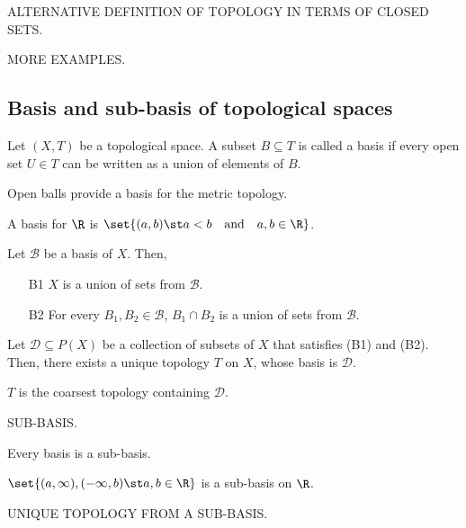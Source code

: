 ALTERNATIVE DEFINITION OF TOPOLOGY IN TERMS OF CLOSED SETS.

MORE EXAMPLES.

\subsection{Basis and sub-basis of topological spaces}
\begin{ndfn}
  Let $(X,T)$ be a topological space. A subset $B \subseteq T$ is called a basis if every open set $U \in T$ can be written as a union of elements of $B$.
\end{ndfn}

\begin{negg}
  Open balls provide a basis for the metric topology.
\end{negg}

\begin{negg}
  A basis for $\R$ is $\set{(a,b) \st a<b \quad\text{and}\quad a,b\in\R}$.
\end{negg}

\begin{nlemma}
  Let $\mathcal{B}$ be a basis of $X$. Then,
  \begin{enumerate}
  \item[B1] $X$ is a union of sets from $\mathcal{B}$.
  \item[B2] For every $B_1, B_2 \in \mathcal{B}$, $B_1 \cap B_2$ is a union of sets from $\mathcal{B}$.
  \end{enumerate}
\end{nlemma}

\begin{nlemma}
  Let $\mathcal{D} \subseteq P(X)$ be a collection of subsets of $X$ that satisfies (B1) and (B2). Then, there exists a unique topology $T$ on $X$, whose basis is $\mathcal{D}$.
\end{nlemma}
$T$ is the coarsest topology containing $\mathcal{D}$.

\begin{ndfn}
  SUB-BASIS.
\end{ndfn}

\begin{nprop}
  Every basis is a sub-basis.
\end{nprop}

\begin{negg}
  $\set{(a,\infty), (-\infty,b) \st a,b \in \R}$ is a sub-basis on $\R$.
\end{negg}

\begin{nprop}
  UNIQUE TOPOLOGY FROM A SUB-BASIS.
\end{nprop}

